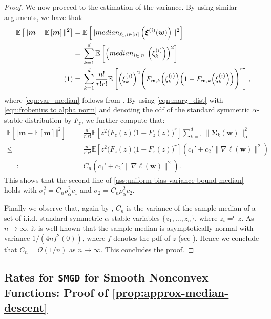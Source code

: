 \documentclass[10pt]{article} %
\newcommand\numberthis{\addtocounter{equation}{1}\tag{\theequation}}
\renewcommand{\vec}[1]{\bm{#1}}
\newcommand{\E}[1]{\mathbb{E}\left[#1\right] }
\newcommand{\median}{\texttt{median}}
\newcommand{\samplemedian}[1]{\texttt{median}_{#1,i\in[n]}}
\newcommand{\SMGD}{\texttt{SMGD}}
\begin{document}
\begin{proof}
We now proceed to the estimation of the variance. By using similar arguments, we have that:
\begin{align*}
   \E{ \Vert \vec{m} - \E{\vec{m} } \Vert^2  } =\; & \E{ \Vert  \samplemedian{\ell_1}\left(\vec{\xi}^{(i)}(\vec{w}) \right)  \Vert^2  } \\
   = \;& \sum_{k=1}^d \E{ \left(  \median_{i \in [n]}\left( \xi_k^{(i)} \right)  \right)^2  } \\
   \numberthis \label{eqn:var_median}
   =\; & \sum_{k=1}^d \frac{n!}{r!r!}  \mathbb{E}\left[\Bigl(\xi_k^{(i)}\Bigr)^2 \Biggl(F_{\vec{w},k}\Bigl(\xi_k^{(i)}\Bigr)\Bigl(1-F_{\vec{w},k}\Bigl(\xi_k^{(i)}\Bigr)\Bigr) \Biggr)^r \right],
\end{align*}
where \eqref{eqn:var_median} follows from \citet[Equation 2.1]{maritz1978note}. By using \eqref{eqn:marg_dist} with \eqref{eqn:frobenius to alpha norm} and denoting the cdf of the standard symmetric $\alpha$-stable distribution by $F_{z}$, we further compute that:
\begin{align*}
   \E{ \Vert \vec{m} - \E{\vec{m}} \Vert^2 } 
   = \; & \frac{n!}{r!r!} \mathbb{E}\left[z^2  \Biggl(F_{z}(z)(1-F_{z}(z) \Biggr)^r  \right]   \sum_{k=1}^d \|\vec{\Sigma}_{k}(\vec{w})\|_{\alpha}^2  \\
   \leq \; & \frac{n!}{r!r!} \mathbb{E}\left[z^2  \Biggl(F_{z}(z)(1-F_{z}(z) \Biggr)^r  \right] \left(c_1' + c_2' \|\nabla \ell(\vec{w})\|^2 \right) \\
   =: \; & C_n \left(c_1' + c_2' \|\nabla \ell(\vec{w})\|^2 \right).
\end{align*}
This shows that the second line of \cref{ass:uniform-bias-variance-bound-median} holds with $\sigma_1^2 = C_n \rho_\alpha^2 c_1$ and $\sigma_2 = C_n \rho_\alpha^2 c_2$.


Finally we observe that, again by \citet[Equation 2.1]{maritz1978note}, $C_n$ is the variance of the sample median of a set of i.i.d. standard symmetric $\alpha$-stable variables $\{z_1, \dots, z_{n}\}$, where $z_i =^{\mathrm{d}} z$. As $n\to \infty$, it is well-known that the sample median is asymptotically normal with variance $1/(4n f^2(0))$, where $f$ denotes the pdf of $z$ (see \citet{maritz1978note}). Hence we conclude that $C_n = \mathcal{O}(1/n)$ as $n\to \infty$. This concludes the proof.
\end{proof}



\subsection{Rates for \SMGD{} for Smooth Nonconvex Functions: Proof of \cref{prop:approx-median-descent} }
\end{document}
